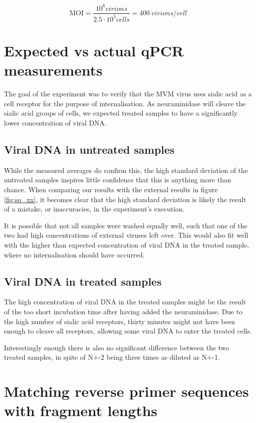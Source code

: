 \documentclass[a4paper,english]{scrreprt}
\begin{document}
\[
	\text{MOI} = \frac{10^8 \si{virions}}{2.5 \cdot 10^5 \si{cells}} = \SI{400}{virions \per cell}
\]

\section{Expected vs actual qPCR measurements}

The goal of the experiment was to verify that the MVM virus uses sialic acid
as a cell receptor for the purpose of internalisation. As neuraminidase will
cleave the sialic acid groups of cells, we expected treated samples to have a
significantly lower concentration of viral DNA.

\subsection{Viral DNA in untreated samples}

While the measured averages do confirm this, the high standard deviation of the
untreated samples inspires little confidence that this is anything more than
chance. When comparing our results with the external results in figure
\ref{fig:sq_xx}, it becomes clear that the high standard deviation is likely
the result of a mistake, or inaccuracies, in the experiment's execution.

It is possible that not all samples were washed equally well, such that one of
the two had high concentrations of external viruses left over. This would also
fit well with the higher than expected concentration of viral DNA in the
treated sample, where no internalisation should have occurred.

\subsection{Viral DNA in treated samples}

The high concentration of viral DNA in the treated samples might be the result
of the too short incubation time after having added the neuraminidase. Due to
the high number of sialic acid receptors, thirty minutes might not have been
enough to cleave all receptors, allowing some viral DNA to enter the treated
cells.

Interestingly enough there is also no significant difference between the two
treated samples, in spite of N$+$-2 being three times as diluted as N$+$-1.

\section{Matching reverse primer sequences with fragment lengths}
\end{document}
